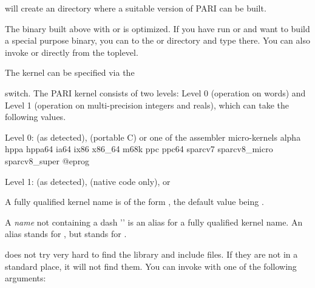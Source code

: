 
\noindent will create an  directory where a suitable version
of PARI can be built.

The  binary built above with  or  is
optimized. If you have run  or  and want to build
a special purpose binary, you can  to the  or 
directory and type  there. You can also invoke 
or  directly from the toplevel.

 The kernel can be specified via the


\noindent switch. The PARI kernel consists of two levels: Level 0 (operation
on words) and Level 1 (operation on multi-precision integers and reals),
which can take the following values.

Level 0:  (as detected),  (portable C) or
one of the assembler micro-kernels
\bprog
  alpha
  hppa hppa64
  ia64
  ix86 x86_64
  m68k
  ppc ppc64
  sparcv7 sparcv8_micro sparcv8_super
@eprog

Level 1:  (as detected),  (native code only), or 

\noindent\item A fully qualified kernel name is of the form
, the default value being .

\noindent\item A \emph{name} not containing a dash '\kbd{-}' is an alias
for a fully qualified kernel name. An alias stands for
, but  stands for .

 does not try very hard to find the  library and
include files. If they are not in a standard place, it will not find them.
You can invoke  with one of the following arguments:





